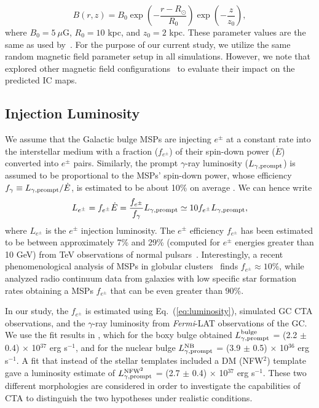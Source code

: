 \documentclass[doublespace,draft,nopageskip]{VTthesis} %
\begin{document}
\begin{equation}\label{eq:Bfield}
	B(r,z) = B_0 \exp{\left(-\dfrac{r-R_\odot}{R_0}\right)}\exp{\left(-\dfrac{z}{z_0}\right)},
\end{equation}
where $B_0 = 5\ \mu$G, $R_0 = 10$ kpc, and $z_0 = 2$ kpc. These parameter values are the same as used by~\citet{Johannesson:2018bit}. For the purpose of our current study, we utilize the same random magnetic field parameter setup in all simulations. However, 
we note that \cite{Song:2019nrx} explored other magnetic field configurations~\citep{Crocker:2010xc} to evaluate their impact on the predicted IC maps. 



\subsection{Injection Luminosity}

We assume that the Galactic bulge MSPs are injecting $e^{\pm}$ at a constant rate into the interstellar medium with a fraction ($f_{e^{\pm}}$) of their spin-down power ($\dot E$) converted into $e^{\pm}$ pairs. Similarly, the prompt $\gamma$-ray luminosity ($L_{\gamma,{\rm prompt}}$) is assumed to be proportional to the MSPs' spin-down power, whose efficiency $f_\gamma \equiv L_{\gamma,{\rm prompt}}/\dot{E}$, is estimated to be about 10\% on average \citep{TheFermi-LAT:2013ssa}. We can hence write 
\begin{equation}\label{eq:luminosity}
  L_{e^\pm}=f_{e^\pm}\dot{E}=\frac{f_{e^\pm}}{f_{\gamma}}  L_{\gamma,{\rm prompt}} \simeq 10f_{e^\pm} L_{\gamma,{\rm prompt}},
\end{equation}
where $L_{e^\pm}$ is the $e^\pm$ injection luminosity. The $e^\pm$ efficiency $f_{e^\pm}$ has been estimated to be between approximately 7\% and 29\% (computed for $e^\pm$ energies greater than 10 GeV) from TeV observations of normal pulsars~\citep{Hooper:2017gtd}.
Interestingly, a recent phenomenological analysis of MSPs in globular clusters~\citep{Song:2021zrs} finds $f_{e^\pm}\approx 10\%$, while \citet{Sudoh:2020hyu} analyzed radio continuum data from galaxies with low specific star formation rates obtaining a MSPs $f_{e^\pm}$ that can be even greater than $90\%$.



In our study, the $f_{e^\pm}$ is estimated using Eq.~(\ref{eq:luminosity}), simulated GC CTA observations, and the $\gamma$-ray luminosity from \textit{Fermi}-LAT observations of the GC. We use the fit results in \cite{Macias:2019omb}, which for the boxy bulge obtained $L^{\text{bulge}}_{\gamma,{\rm prompt}}$ = (2.2 $\pm$ 0.4) $\times$ 10$^{37}$ erg s$^{-1}$, and for the nuclear bulge $L^{\text{NB}}_{\gamma,{\rm prompt}}$ = (3.9 $\pm$ 0.5) $\times$ 10$^{36}$ erg s$^{-1}$. A fit that instead of the stellar templates included a DM (NFW$^2$) template gave a luminosity estimate of $L^{\text{NFW}^2}_{\gamma,{\rm prompt}}$ = (2.7 $\pm$ 0.4) $\times$ 10$^{37}$ erg s$^{-1}$. These two different morphologies are considered in order to investigate the capabilities of CTA to distinguish the two hypotheses under realistic conditions.
\end{document}
